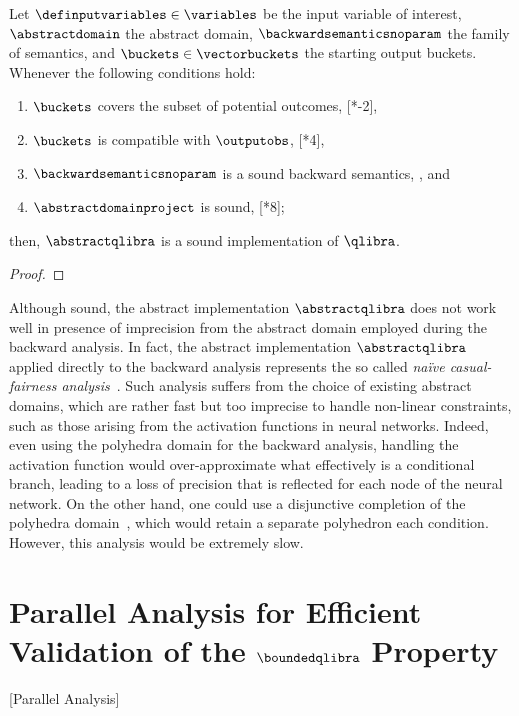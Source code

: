 \begin{lemma}
  Let $\definputvariables\in\variables$ be the input variable of interest, $\abstractdomain$ the abstract domain, $\backwardsemanticsnoparam$ the family of semantics, and $\buckets\in\vectorbuckets$ the starting output buckets.
  Whenever the following conditions hold:
  \begin{enumerate}[label=(\roman*)]
    \item \label{nioa1} $\buckets$ covers the subset of potential outcomes, \cf{} [*-2],
    \item \label{nioa2} $\buckets$ is compatible with $\outputobs$, \cf{} [*4],
    \item \label{nioa3} $\backwardsemanticsnoparam$ is a sound backward semantics, \cf{} , and
    \item \label{nioa4} $\abstractdomainproject$ is sound, \cf{} [*8];
  \end{enumerate}
  then, $\abstractqlibra$ is a sound implementation of $\qlibra$.
\end{lemma}
\begin{proof}
\end{proof}



Although sound, the abstract implementation $\abstractqlibra$ does not work well in presence of imprecision from the abstract domain employed during the backward analysis.
In fact, the abstract implementation $\abstractqlibra$ applied directly to the backward analysis represents the so called \emph{na\"ive casual-fairness analysis}~.
Such analysis suffers from the choice of existing abstract domains, which are rather fast but too imprecise to handle non-linear constraints, such as those arising from the activation functions in neural networks.
Indeed, even using the polyhedra domain for the backward analysis, handling the \relu{} activation function would over-approximate what effectively is a conditional branch, leading to a loss of precision that is reflected for each node of the neural network.
On the other hand, one could use a disjunctive completion of the polyhedra domain~, which would retain a separate polyhedron each condition.
However, this analysis would be extremely slow.

\section{Parallel Analysis for Efficient Validation of the \texorpdfstring{$\boundedqlibra$ Property}{k-Bounded Impact Property applied to qlibra}}[Parallel Analysis]


